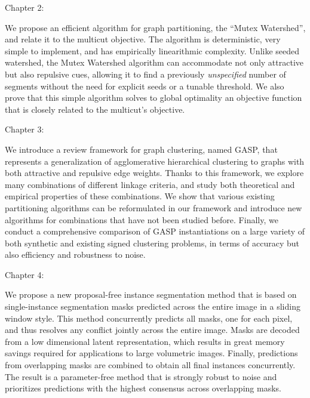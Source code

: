 \begin{paracol}{2}
\begin{leftcolumn*}
\noindent  Chapter 2:
\end{leftcolumn*}
\begin{rightcolumn}
\noindent We propose an efficient algorithm for graph partitioning, the ``Mutex Watershed'', and relate it to the multicut objective. 
The algorithm is deterministic, very simple to implement, and has empirically linearithmic complexity. 
Unlike seeded watershed, the Mutex Watershed algorithm can accommodate not only attractive but also repulsive cues, allowing it to find a previously \emph{unspecified} number of segments without the need for explicit seeds or a tunable threshold. We also prove that this simple algorithm solves to global optimality an objective function that is closely related to the multicut's objective. 
\end{rightcolumn}
\medskip
\begin{leftcolumn*}
\noindent  Chapter 3:
\end{leftcolumn*}
\begin{rightcolumn}
\noindent We introduce a review framework for graph clustering, named GASP, that represents a generalization of agglomerative hierarchical clustering to graphs with both attractive and repulsive edge weights. Thanks to this framework, we explore many combinations of different linkage criteria, and study both theoretical and empirical properties of these combinations. 
We show that various existing partitioning algorithms can be reformulated in our framework and introduce new algorithms for combinations that have not been studied before.
Finally, we conduct a comprehensive comparison of GASP instantiations on a large variety of both synthetic and existing signed clustering problems, in terms of accuracy but also efficiency and robustness to noise. 
\end{rightcolumn}
\medskip
\begin{leftcolumn*}
\noindent  Chapter 4:
\end{leftcolumn*}
\begin{rightcolumn}
\noindent We propose a new proposal-free instance segmentation method that is based on single-instance segmentation masks predicted across the entire image in a sliding window style.
This method concurrently predicts all masks, one for each pixel, and thus resolves any conflict jointly across the entire image. Masks are decoded from a low dimensional latent representation, which results in great memory savings required for applications to large volumetric images. 
Finally, predictions from overlapping masks are combined to obtain all final instances concurrently.
The result is a parameter-free method that is strongly robust to noise and prioritizes predictions with the highest consensus across overlapping masks. 
\end{rightcolumn}
\end{paracol}




